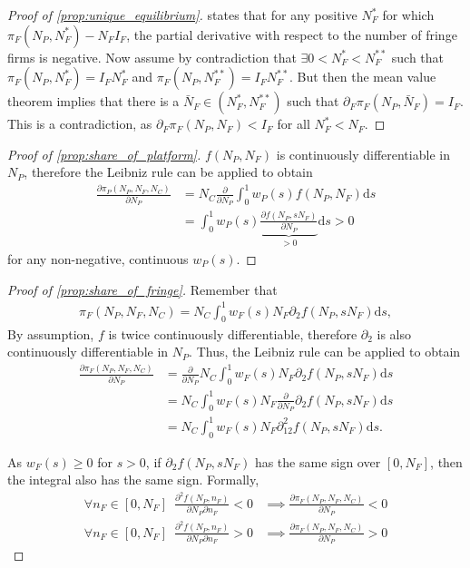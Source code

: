 \documentclass[a4paper]{article}
\newcommand{\ds}{\mathrm{d}s}
\begin{document}
\begin{proof}[Proof of \cref{prop:unique_equilibrium}]
     states that for any positive $N_F^*$ for which $\pi_F(N_P, N_F^*) - N_F I_F$, the partial derivative with respect to the number of fringe firms is negative.
    Now assume by contradiction that $\exists 0 < N_F^* < N_F^{**}$ such that $\pi_F(N_P, N_F^*) = I_F N_F^*$ and $\pi_F(N_P, N_F^{**}) = I_F N_F^{**}$.
    But then the mean value theorem implies that there is a $\bar{N}_F \in (N_F^*, N_F^{**})$ such that $\partial_F \pi_F(N_P, \bar{N}_F) = I_F$.
    This is a contradiction, as $\partial_F \pi_F(N_P, N_F) < I_F$ for all $N_F^* < N_F$.
\end{proof}

\begin{proof}[Proof of \cref{prop:share_of_platform}]
    $f(N_P, N_F)$ is continuously differentiable in $N_P$, therefore the Leibniz rule can be applied to obtain
    \begin{align*}
        \frac{\partial \pi_P(N_P, N_F, N_C)}{\partial N_P} &= N_C \frac{\partial}{\partial N_P} \int_0^1 w_P(s) f(N_P, N_F) \ds \\
        &= \int_0^1 w_P(s) \underbrace{\frac{\partial f(N_P, sN_F)}{\partial N_P}}_{> 0} \ds > 0
    \end{align*}
    for any non-negative, continuous $w_P(s)$.
\end{proof}

\begin{proof}[Proof of \cref{prop:share_of_fringe}]
    Remember that
    \begin{align*}
        \pi_F(N_P, N_F, N_C) = N_C \int_0^1 w_F(s) N_F \partial_2 f(N_P, s N_F) \ds,
    \end{align*}
    By assumption, $f$ is twice continuously differentiable, therefore $\partial_2$ is also continuously differentiable in $N_P$.
    Thus, the Leibniz rule can be applied to obtain
    \begin{align*}
        \frac{\partial \pi_F(N_P, N_F, N_C)}{\partial N_P} &= \frac{\partial}{\partial N_P} N_C \int_0^1 w_F(s) N_F \partial_2 f(N_P, s N_F) \ds \\
        &= N_C \int_0^1 w_F(s) N_F \frac{\partial}{\partial N_P} \partial_2 f(N_P, s N_F) \ds \\
        &= N_C \int_0^1 w_F(s) N_F \partial^2_{12} f(N_P, s N_F) \ds.
    \end{align*}

    As $w_F(s) \geq 0$ for $s > 0$, if $\partial_2 f(N_P, s N_F)$ has the same sign over $[0, N_F]$, then the integral also has the same sign.
    Formally,
    \begin{align*}
        \forall n_F \in [0, N_F] \enspace \frac{\partial^2 f(N_P, n_F)}{\partial N_P \partial n_F} < 0 &\implies \frac{\partial \pi_F(N_P, N_F, N_C)}{\partial N_P} < 0 \\
        \forall n_F \in [0, N_F] \enspace \frac{\partial^2 f(N_P, n_F)}{\partial N_P \partial n_F} > 0 &\implies \frac{\partial \pi_F(N_P, N_F, N_C)}{\partial N_P} > 0
    \end{align*}
\end{proof}
\end{document}
